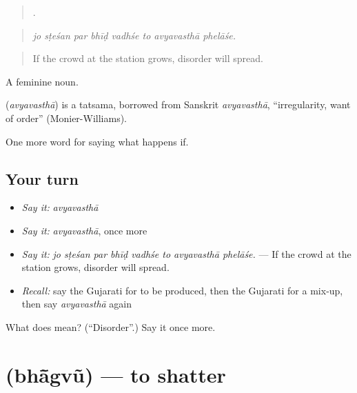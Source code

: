 \begin{quote}
       .
\end{quote}

\begin{quote}
\emph{jo sṭeśan par bhīḍ vadhśe to avyavasthā phelāśe.}
\end{quote}

\begin{quote}
If the crowd at the station grows, disorder will spread.
\end{quote}

A feminine noun.

\begin{cousinweb}
\textbf{} (\emph{avyavasthā}) is a tatsama, borrowed from Sanskrit \emph{avyavasthā}, \textquotedblleft{}irregularity, want of order\textquotedblright{} (Monier-Williams).
\end{cousinweb}

\begin{grammarlens}[title={What you've built}]
One more word for saying what happens if.
\end{grammarlens}

\subsection*{Your turn}
\begin{itemize}
\raggedright
  \item \emph{Say it:} \emph{avyavasthā}
  \item \emph{Say it:} \emph{avyavasthā}, once more
  \item \emph{Say it:} \emph{jo sṭeśan par bhīḍ vadhśe to avyavasthā phelāśe.} — If the crowd at the station grows, disorder will spread.
  \item \emph{Recall:} say the Gujarati for to be produced, then the Gujarati for a mix-up, then say \emph{avyavasthā} again
\end{itemize}

\begin{tcolorbox}[breakable,colback=teal!4,colframe=teal!35!black,title={Before you move on}]
What does  mean? (\textquotedblleft{}Disorder\textquotedblright{}.) Say it once more.
\end{tcolorbox}
\section[\texorpdfstring{\gu{ભાંગવું} (bhā̃gvũ)}{ભાંગવું (bhā̃gvũ)}]{ (bhā̃gvũ) — to shatter}

